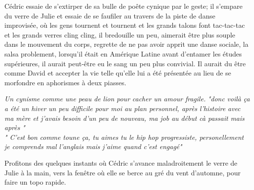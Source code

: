  \setlength{\columnsep}{4em}
\begin{paracol}{2}
Cédric essaie
de s'extirper de sa bulle de poête cynique par le geste; il s'empare du
verre de Julie et essaie de se faufiler au travers de la piste de danse
improvisée, où les gens tournent et tournent et les grands talons font
tac-tac-tac et les grands verres cling cling, il bredouille un peu, aimerait
être plus souple dans le mouvement du corps, regrette de ne pas avoir apprit
une danse sociale, la salsa problement, lorsqu'il était en Amérique Latine
avant d'entamer les études supérieures, il aurait peut-être eu le sang un
peu plus convivial. Il aurait du être comme David et accepter la vie telle
qu'elle lui a été présentée au lieu de se morfondre en aphorismes à deux
piasses. 

\emph{Un cynisme comme une peau de lion pour cacher un amour fragile.}  \switchcolumn
{} \phantom{}
\small
\textit{"\textelp{}donc voilà ça a été un hiver un peu difficile pour moi au
    plan personnel, après l'histoire avec ma mère et j'avais besoin d'un peu de
    nouveau, ma job au début cà passait mais après \textelp{}"\\[3em]
    "\textelp{} C'est bon comme toune ça, tu aimes tu le hip hop progressiste,
    personellement je comprends mal l'anglais mais j'aime quand c'est engagé"}
\end{paracol}
Profitons des quelques
instants où Cédric s'avance maladroitement le verre de Julie à la main, vers
la fenêtre où elle se berce au gré du vent d'automne, pour faire un topo
rapide. 
 \setlength{\columnsep}{4em}
